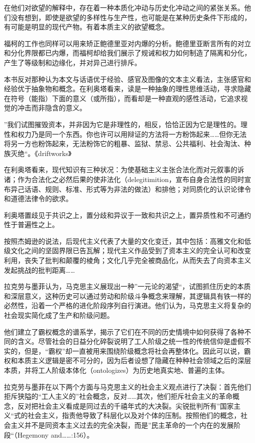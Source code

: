 在他们对欲望的解释中，存在着一种本质化冲动与历史化冲动之间的紧张关系。他们没有想到，即使是欲望的多样性与生产性，也可能是在某种历史条件下形成的，有可能是明显的现代产物。有着本质主义的欲望概念。

福柯的工作也同样可以用来矫正鲍德里亚对内爆的分析。鲍德里亚断言所有的对立和分化界限都已内爆，而福柯却给我们展示了规诫和权力如何制造了隔离和分化，产生了等级制和边缘化，并对异己进行排斥。



本书反对那种认为本文与话语优于经验、感官及图像的文本主义看法，主张感官和经验优于抽象物和概念。在利奥塔看来，读是一种抽象的理性思维活动，寻求隐藏在符号（能指）下面的意义（或所指），而看却是一种直观的感性活动，它追求视觉的冲击而非隐含的意义。

”我们试图摧毁资本，并非因为它是非理性的，相反，恰恰正因为它是理性的。理性和权力乃是同一个东西。你也许可以用辩证的方法将一方粉饰起来……但你无法将另一方也粉饰起来，无法粉饰它的粗暴、监狱、禁忌、公共福利、社会淘汰、种族灭绝“。《driftworks》

在利奥塔看来，现代知识有三种状况：为使基础主义主张合法化而对元叙事的诉诸；作为合法化之必然后果的使非法化（delegitimition，宣布自身合法性的同时宣布异己话语、规则、标准、形式等为非法的做法）和排他；对同质化的认识论律令和道德法律令的欲求。

利奥塔置歧见于共识之上，置分歧和异议于一致和共识之上，置异质性和不可通约性于普遍性之上。

按照杰姆逊的说法，后现代主义代表了大量的文化变迁，其中包括：高雅文化和低级文化之间的坚固界限已告瓦解；现代主义作品受到了资本主义的完全认可和改变利用，丧失了批判和颠覆的棱角；文化几乎完全被商品化，从而失去了向资本主义发起挑战的批判距离……

拉克劳与墨菲认为，马克思主义展现出一种”一元论的渴望“，试图抓住历史的本质和深层意义，这种历史可以通过劳动和阶级斗争概念来理解，其逻辑具有铁一样的必然性，沿着一个严格的进化阶段序列自行演进。他们认为，马克思主义将复杂的社会现实简化成了生产和阶级问题。

他们建立了霸权概念的谱系学，揭示了它们在不同的历史情境中如何获得了各种不同的含义。尽管社会的日益分化碎裂说明了工人阶级之统一性的传统信仰是虚假不实的，但是，“霸权”却一直被用来围绕阶级概念将社会再整体化。因此可以说，霸权和本质主义逻辑是密不可分的，因为后者设想了隐藏在种种社会领域之后的深层本质，并将工人阶级本体化（ontologizes）为历史地真实地、普遍的主体。

拉克劳与墨菲在以下两个方面与马克思主义的社会主义观点进行了决裂：首先他们拒斥狭隘的“工人主义的”社会概念，反对……其次，他们拒斥社会主义的革命概念，反对把社会主义看成是同过去的千禧年式的大决裂。尖锐批判所有”国家主义“式的社会主义，指责他导致了科层化以及对个体的压制。按照他们的概念，社会主义并不是同资本主义过去的完全决裂，而是”民主革命的一个内在的发展阶段“（Hegemony and……:156）。

